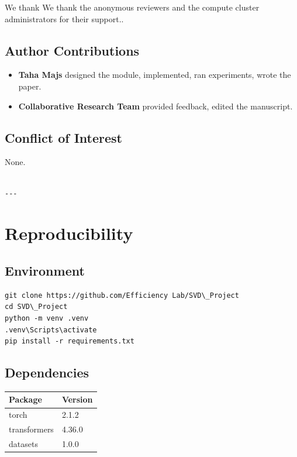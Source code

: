 We thank We thank the anonymous reviewers and the compute cluster administrators for their support..

\subsection{Author Contributions}

\begin{itemize}
\item \textbf{Taha Majs} designed the module, implemented, ran experiments, wrote
  the paper.
\item \textbf{Collaborative Research Team} provided feedback, edited the manuscript.

\end{itemize}
\subsection{Conflict of Interest}

None.
\begin{lstlisting}

---
\end{lstlisting}

\section{Reproducibility}

\subsection{Environment}

\begin{lstlisting}
git clone https://github.com/Efficiency Lab/SVD\_Project
cd SVD\_Project
python -m venv .venv
.venv\Scripts\activate
pip install -r requirements.txt
\end{lstlisting}

\subsection{Dependencies}

\begin{table}[H]
\centering
\small
\begin{tabular}{ll}
\toprule
\textbf{Package} & \textbf{Version} \\
\midrule
torch & 2.1.2 \\
transformers & 4.36.0 \\
datasets & 1.0.0 \\
\bottomrule
\end{tabular}
\end{table}

